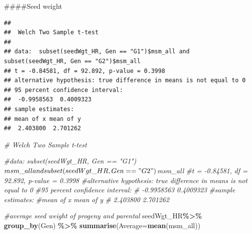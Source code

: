 \documentclass[
]{article}
\newenvironment{Shaded}{\begin{snugshade}}{\end{snugshade}}
\newcommand{\AttributeTok}[1]{\textcolor[rgb]{0.13,0.29,0.53}{#1}}
\newcommand{\CommentTok}[1]{\textcolor[rgb]{0.56,0.35,0.01}{\textit{#1}}}
\newcommand{\DecValTok}[1]{\textcolor[rgb]{0.00,0.00,0.81}{#1}}
\newcommand{\FunctionTok}[1]{\textcolor[rgb]{0.13,0.29,0.53}{\textbf{#1}}}
\newcommand{\NormalTok}[1]{#1}
\newcommand{\OtherTok}[1]{\textcolor[rgb]{0.56,0.35,0.01}{#1}}
\newcommand{\SpecialCharTok}[1]{\textcolor[rgb]{0.81,0.36,0.00}{\textbf{#1}}}
\newcommand{\StringTok}[1]{\textcolor[rgb]{0.31,0.60,0.02}{#1}}
\begin{document}
\#\#\#\#Seed weight

\begin{Shaded}
\end{Shaded}

\begin{verbatim}
## 
##  Welch Two Sample t-test
## 
## data:  subset(seedWgt_HR, Gen == "G1")$msm_all and subset(seedWgt_HR, Gen == "G2")$msm_all
## t = -0.84581, df = 92.892, p-value = 0.3998
## alternative hypothesis: true difference in means is not equal to 0
## 95 percent confidence interval:
##  -0.9958563  0.4009323
## sample estimates:
## mean of x mean of y 
##  2.403800  2.701262
\end{verbatim}

\begin{Shaded}
\begin{Highlighting}[]
\CommentTok{\#   Welch Two Sample t{-}test}

\CommentTok{\#data:  subset(seedWgt\_HR, Gen == "G1")$msm\_all and subset(seedWgt\_HR, Gen == "G2")$msm\_all}
\CommentTok{\#t = {-}0.84581, df = 92.892, p{-}value = 0.3998}
\CommentTok{\#alternative hypothesis: true difference in means is not equal to 0}
\CommentTok{\#95 percent confidence interval:}
\CommentTok{\# {-}0.9958563  0.4009323}
\CommentTok{\#sample estimates:}
\CommentTok{\#mean of x mean of y }
\CommentTok{\# 2.403800  2.701262 }

\CommentTok{\#average seed weight of progeny and parental}
\NormalTok{seedWgt\_HR}\SpecialCharTok{\%\textgreater{}\%}
  \FunctionTok{group\_by}\NormalTok{(Gen) }\SpecialCharTok{\%\textgreater{}\%}
  \FunctionTok{summarise}\NormalTok{(}\AttributeTok{Average=}\FunctionTok{mean}\NormalTok{(msm\_all))}
\end{Highlighting}
\end{Shaded}
\end{document}
